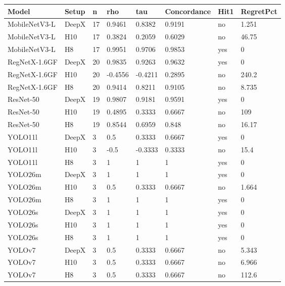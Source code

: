 \begin{tabular}{llllllll}
\hline
Model & Setup & n & rho & tau & Concordance & Hit1 & RegretPct \\
\hline
MobileNetV3-L & DeepX & 17 & 0.9461 & 0.8382 & 0.9191 & no & 1.251 \\
MobileNetV3-L & H10 & 17 & 0.3824 & 0.2059 & 0.6029 & no & 46.75 \\
MobileNetV3-L & H8 & 17 & 0.9951 & 0.9706 & 0.9853 & yes & 0 \\
RegNetX-1.6GF & DeepX & 20 & 0.9835 & 0.9263 & 0.9632 & yes & 0 \\
RegNetX-1.6GF & H10 & 20 & -0.4556 & -0.4211 & 0.2895 & no & 240.2 \\
RegNetX-1.6GF & H8 & 20 & 0.9414 & 0.8211 & 0.9105 & no & 8.735 \\
ResNet-50 & DeepX & 19 & 0.9807 & 0.9181 & 0.9591 & yes & 0 \\
ResNet-50 & H10 & 19 & 0.4895 & 0.3333 & 0.6667 & no & 109 \\
ResNet-50 & H8 & 19 & 0.8544 & 0.6959 & 0.848 & no & 16.17 \\
YOLO11l & DeepX & 3 & 0.5 & 0.3333 & 0.6667 & yes & 0 \\
YOLO11l & H10 & 3 & -0.5 & -0.3333 & 0.3333 & no & 15.4 \\
YOLO11l & H8 & 3 & 1 & 1 & 1 & yes & 0 \\
YOLO26m & DeepX & 3 & 1 & 1 & 1 & yes & 0 \\
YOLO26m & H10 & 3 & 0.5 & 0.3333 & 0.6667 & no & 1.664 \\
YOLO26m & H8 & 3 & 1 & 1 & 1 & yes & 0 \\
YOLO26s & DeepX & 3 & 1 & 1 & 1 & yes & 0 \\
YOLO26s & H10 & 3 & 1 & 1 & 1 & yes & 0 \\
YOLO26s & H8 & 3 & 1 & 1 & 1 & yes & 0 \\
YOLOv7 & DeepX & 3 & 0.5 & 0.3333 & 0.6667 & no & 5.343 \\
YOLOv7 & H10 & 3 & 0.5 & 0.3333 & 0.6667 & no & 6.966 \\
YOLOv7 & H8 & 3 & 0.5 & 0.3333 & 0.6667 & no & 112.6 \\
\hline
\end{tabular}
